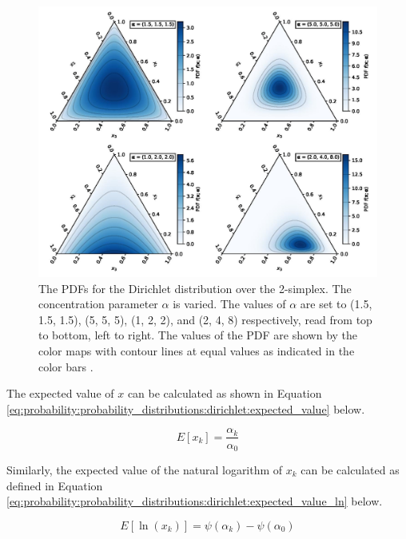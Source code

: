 \begin{figure}[htbp]
    \includegraphics[width=\textwidth]{images/dirichlet.jpg}
    \caption{The \acp{PDF} for the Dirichlet distribution over the 2-simplex. The concentration parameter $\alpha$ is varied. The values of $\alpha$ are set to (1.5, 1.5, 1.5), (5, 5, 5), (1, 2, 2), and (2, 4, 8) respectively, read from top to bottom, left to right. The values of the \ac{PDF} are shown by the color maps with contour lines at equal values as indicated in the color bars \cite{ref:dirichlet:2020}.}
    \label{fig:probability:probability_distributions:dirichlet}
\end{figure}

The expected value of $x$ can be calculated as shown in Equation \ref{eq:probability:probability_distributions:dirichlet:expected_value} below.

\begin{equation}
    \label{eq:probability:probability_distributions:dirichlet:expected_value}
    E[x_{k}] = \frac{\alpha_{k}}{\alpha_{0}}
\end{equation}

Similarly, the expected value of the natural logarithm of $x_{k}$ can be calculated as defined in Equation \ref{eq:probability:probability_distributions:dirichlet:expected_value_ln} below.

\begin{equation}
\label{eq:probability:probability_distributions:dirichlet:expected_value_ln}
    E[\ln(x_{k})] = \psi({\alpha_{k}}) - \psi(\alpha_{0})
\end{equation}

